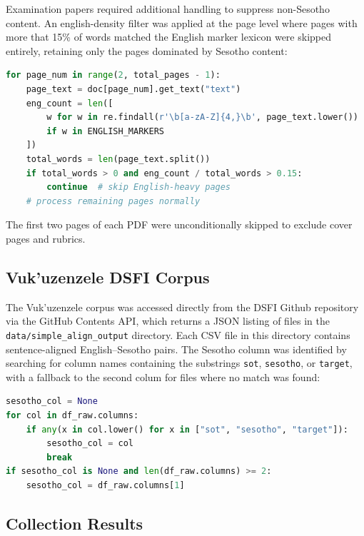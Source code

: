 \documentclass[12pt]{ThesisRU}
\begin{document}
Examination papers required additional handling to suppress non-Sesotho content. An english-density filter was applied at the page level where pages with more that 15\% of words matched the English marker lexicon were skipped entirely, retaining only the pages dominated by Sesotho content:

\begin{lstlisting}[language=Python, caption={English-density page filter for exam PDF extraction.}, label={lst:pdf}]
for page_num in range(2, total_pages - 1):
    page_text = doc[page_num].get_text("text")
    eng_count = len([
        w for w in re.findall(r'\b[a-zA-Z]{4,}\b', page_text.lower())
        if w in ENGLISH_MARKERS
    ])
    total_words = len(page_text.split())
    if total_words > 0 and eng_count / total_words > 0.15:
        continue  # skip English-heavy pages
    # process remaining pages normally
\end{lstlisting}

The first two pages of each PDF were unconditionally skipped to exclude cover pages and rubrics.

\subsection{Vuk'uzenzele DSFI Corpus}

The Vuk'uzenzele corpus was accessed directly from the DSFI Github repository via the GitHub Contents API, which returns a JSON listing of files in the \texttt{data/simple\_align\_output} directory. Each CSV file in this directory contains sentence-aligned English--Sesotho pairs. The Sesotho column was identified by searching for column names containing the substrings \texttt{sot}, \texttt{sesotho}, or \texttt{target}, with a fallback to the second colum for files where no match was found:

\begin{lstlisting}[language=Python, caption={Vuk'uzenzele Sesotho column extraction.}, label={lst:vuku}]
sesotho_col = None
for col in df_raw.columns:
    if any(x in col.lower() for x in ["sot", "sesotho", "target"]):
        sesotho_col = col
        break
if sesotho_col is None and len(df_raw.columns) >= 2:
    sesotho_col = df_raw.columns[1]
\end{lstlisting}


\subsection{Collection Results}
\end{document}
